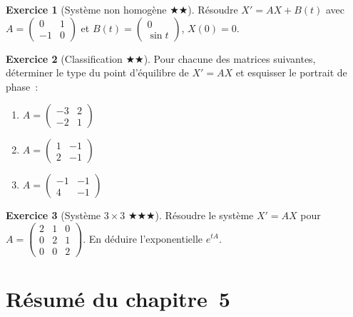 \documentclass[12pt,a4paper,openany]{book}
\theoremstyle{definition}
\newtheorem{exercice}{Exercice}[chapter]
\theoremstyle{plain}
\theoremstyle{remark}
\begin{document}
\begin{exercice}[Système non homogène $\bigstar\bigstar$]\label{exo:syst-non-homog}
  Résoudre $X' = AX + B(t)$ avec
  $A = \begin{pmatrix} 0 & 1 \\ -1 & 0 \end{pmatrix}$ et
  $B(t) = \begin{pmatrix} 0 \\ \sin t \end{pmatrix}$, $X(0) = 0$.
\end{exercice}

\begin{exercice}[Classification $\bigstar\bigstar$]\label{exo:classification}
  Pour chacune des matrices suivantes, déterminer le type du point
  d'équilibre de $X' = AX$ et esquisser le portrait de phase~:
  \begin{enumerate}[label=\alph*)]
    \item $A = \begin{pmatrix} -3 & 2 \\ -2 & 1 \end{pmatrix}$
    \item $A = \begin{pmatrix} 1 & -1 \\ 2 & -1 \end{pmatrix}$
    \item $A = \begin{pmatrix} -1 & -1 \\ 4 & -1 \end{pmatrix}$
  \end{enumerate}
\end{exercice}

\begin{exercice}[Système $3\times 3$ $\bigstar\bigstar\bigstar$]\label{exo:syst-3x3}
  Résoudre le système $X' = AX$ pour
  $A = \begin{pmatrix} 2 & 1 & 0 \\ 0 & 2 & 1 \\ 0 & 0 & 2 \end{pmatrix}$.
  En déduire l'exponentielle $e^{tA}$.
\end{exercice}

\section*{Résumé du chapitre~5}
\end{document}
